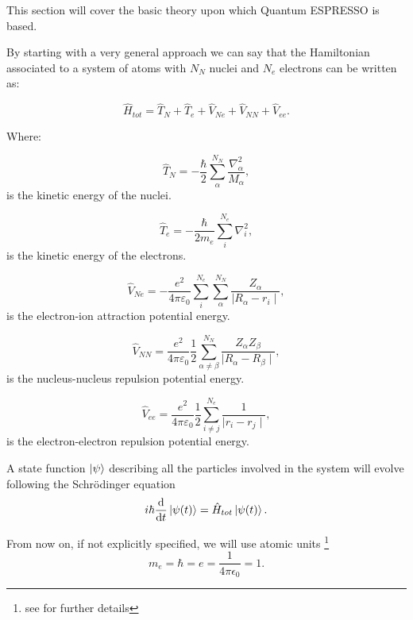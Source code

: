 \documentclass[a4paper,12pt]{article}
\begin{document}
This section will cover the basic theory upon which Quantum ESPRESSO is based.

By starting with a very general approach we can say that the Hamiltonian associated to a system of atoms with $N_N$ nuclei and $N_e$ electrons can be written as:


\begin{equation}\label{eq:theHamiltonianLong}
\hat{H}_{tot} = \hat{T}_{N} + \hat{T}_{e} + \hat{V}_{Ne} + \hat{V}_{NN} + \hat{V}_{ee}.
\end{equation}

Where:

\begin{equation}
\hat{T}_{N} = - \frac{\hbar}{2} \sum_{\alpha}^{N_N} \frac{\nabla_{\alpha}^2}{M_{\alpha}},
\end{equation}
is the kinetic energy of the nuclei.

\begin{equation}
\hat{T}_{e} = - \frac{\hbar}{2m_{e}} \sum_{i}^{N_e} \nabla_{i}^2,
\end{equation}
is the kinetic energy of the electrons.

\begin{equation}
\hat{V}_{Ne} = -\frac{e^2}{4\pi\varepsilon_{0}} \sum_{i}^{N_e}\sum_{\alpha}^{N_N} \frac{Z_{\alpha}}{\mid R_{\alpha} - r_{i} \mid },
\end{equation}
is the electron-ion attraction potential energy.

\begin{equation}
\hat{V}_{NN} = \frac{e^2}{4\pi\varepsilon_{0}} \frac{1}{2} \sum_{\alpha \neq \beta}^{N_N} \frac{Z_{\alpha} Z_{\beta}}{\mid R_{\alpha} - R_{\beta} \mid },
\end{equation}
is the nucleus-nucleus repulsion potential energy.

\begin{equation}
\hat{V}_{ee} = \frac{e^2}{4\pi\varepsilon_{0}} \frac{1}{2} \sum_{i \neq j}^{N_e} \frac{1}{\mid r_{i} - r_{j} \mid },
\end{equation}
is the electron-electron repulsion potential energy.

A state function $\ket{\psi}$ describing all the particles involved in the system will evolve following the Schr\"odinger equation
\begin{equation}\label{eq:eq_sch}
	i\hbar\dv{t}\ket{\psi(t)} = \hat{H}_{tot}\ket{\psi(t)}.
\end{equation}

From now on, if not explicitly specified, we will use atomic units \footnote{see \cite[p.42]{Attila} for further details}
\begin{equation}
	m_{e} = \hbar = e =\frac{1}{4 \pi \epsilon_{0}} = 1.
\end{equation}
\end{document}
